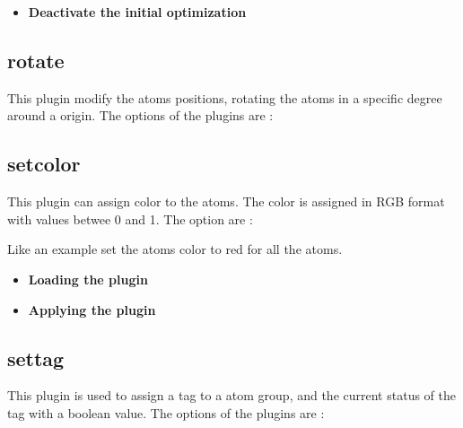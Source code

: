 \begin{itemize}
 \item \textbf{Deactivate the initial optimization}
\end{itemize}


\subsection{rotate}
This plugin modify the atoms positions, rotating the atoms in a specific degree
around a origin. The options of the plugins are :


\subsection{setcolor}
This plugin can assign color to the atoms. The color is assigned in RGB format
with values betwee 0 and 1. The option are :


Like an example set the atoms color to red for all the atoms.

\begin{itemize}
 \item \textbf{Loading the plugin}
 \item \textbf{Applying the plugin}
\end{itemize}

\subsection{settag}
This plugin is used to assign a tag to a atom group, and the current status of
the tag with a boolean value. The options of the plugins are :

